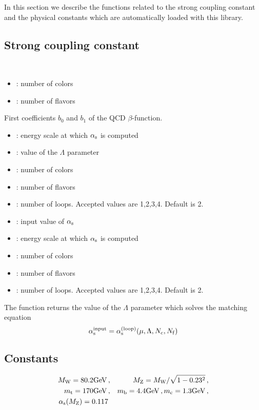 
In this section we describe the functions related to the strong coupling constant
and the physical constants which are automatically loaded with this library.

\subsection{Strong coupling constant}

\\

\begin{itemize}
\item {}: number of colors
\item {}: number of flavors
\end{itemize}

First coefficients $b_0$ and $b_1$ of the QCD $\beta$-function.\\

\hrulefill


\begin{itemize}
\item {}: energy scale at which $\alpha_{\rm s}$ is computed
\item {}: value of the $\Lambda$ parameter
\item {}: number of colors
\item {}: number of flavors
\item {}: number of loops. Accepted values are 1,2,3,4. Default is 2.
\end{itemize}

\hrulefill


\begin{itemize}
\item {}: input value of $\alpha_{\rm s}$
\item {}: energy scale at which $\alpha_{\rm s}$ is computed
\item {}: number of colors
\item {}: number of flavors
\item {}: number of loops. Accepted values are 1,2,3,4. Default is 2.
\end{itemize}

The function returns the value of the $\Lambda$ parameter which solves the matching equation
\begin{equation}
\alpha_{\rm s}^\mathrm{input}  = \alpha_{\rm s}^\mathrm{(loop)}(\mu,\Lambda,N_{\rm c},N_{\rm f})
\end{equation}

\subsection{Constants}


\begin{eqnarray}
M_{\mathrm W} = 80.2 \mathrm{GeV} \, &,& M_{\mathrm Z} = M_{\mathrm W}/\sqrt{1-0.23^2} \,, \\ 
m_{\mathrm t} = 170 \mathrm{GeV} \, &,& m_{\mathrm b} = 4.4 \mathrm{GeV} \,, m_{\mathrm c} = 1.3 \mathrm{GeV} \,, \\
\alpha_{\rm s}(M_{\mathrm Z}) = 0.117
\end{eqnarray}
